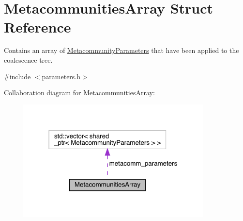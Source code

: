 \hypertarget{struct_metacommunities_array}{}\section{Metacommunities\+Array Struct Reference}
\label{struct_metacommunities_array}


Contains an array of \hyperlink{struct_metacommunity_parameters}{Metacommunity\+Parameters} that have been applied to the coalescence tree.  




{\ttfamily \#include $<$parameters.\+h$>$}



Collaboration diagram for Metacommunities\+Array\+:
\nopagebreak
\begin{figure}[H]
\begin{center}
\leavevmode
\includegraphics[width=279pt]{struct_metacommunities_array__coll__graph}
\end{center}
\end{figure}
